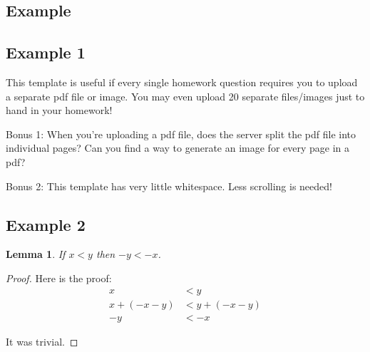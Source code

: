 \documentclass{article}
\newtheorem{lemma}{Lemma}
\begin{document}
\begin{preview}
\section{Example}
\subsection{Example 1}
This template is useful if every single homework question requires you to upload a separate pdf file or image. You may even upload 20 separate files/images just to hand in your homework!

Bonus 1: When you're uploading a pdf file, does the server split the pdf file into individual pages? Can you find a way to generate an image for every page in a pdf?

Bonus 2: This template has very little whitespace. Less scrolling is needed!
\end{preview}

\begin{preview}
\subsection{Example 2}
\begin{lemma}
If $x < y$ then $-y < -x$.
\end{lemma}

\begin{proof}
Here is the proof:
\begin{align*}
x &< y \\
x+(-x-y) &< y+(-x-y) \\
-y &< -x
\end{align*}

It was trivial.
\end{proof}
\end{preview}
\end{document}
